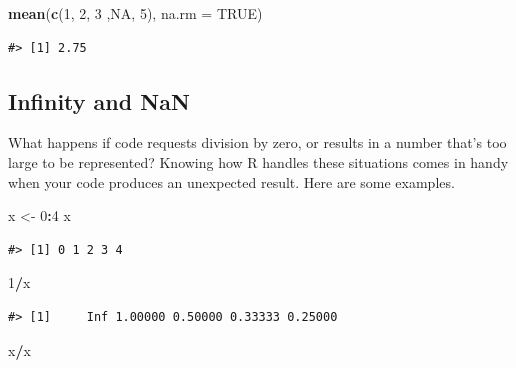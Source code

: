 \documentclass[
  11pt,
]{krantz}
\newenvironment{Shaded}{\begin{snugshade}}{\end{snugshade}}
\newcommand{\DataTypeTok}[1]{\textcolor[rgb]{0.13,0.29,0.53}{#1}}
\newcommand{\DecValTok}[1]{\textcolor[rgb]{0.00,0.00,0.81}{#1}}
\newcommand{\KeywordTok}[1]{\textcolor[rgb]{0.13,0.29,0.53}{\textbf{#1}}}
\newcommand{\NormalTok}[1]{#1}
\newcommand{\OperatorTok}[1]{\textcolor[rgb]{0.81,0.36,0.00}{\textbf{#1}}}
\newcommand{\OtherTok}[1]{\textcolor[rgb]{0.56,0.35,0.01}{#1}}
\newcommand{\StringTok}[1]{\textcolor[rgb]{0.31,0.60,0.02}{#1}}
\theoremstyle{definition}
\theoremstyle{definition}
\theoremstyle{definition}
\theoremstyle{definition}
\theoremstyle{remark}
\begin{document}
\begin{Shaded}
\begin{Highlighting}[]
\KeywordTok{mean}\NormalTok{(}\KeywordTok{c}\NormalTok{(}\DecValTok{1}\NormalTok{, }\DecValTok{2}\NormalTok{, }\DecValTok{3}\NormalTok{ ,}\OtherTok{NA}\NormalTok{, }\DecValTok{5}\NormalTok{), }\DataTypeTok{na.rm =} \OtherTok{TRUE}\NormalTok{)}
\end{Highlighting}
\end{Shaded}

\begin{verbatim}
#> [1] 2.75
\end{verbatim}

\hypertarget{infinity-and-nan}{%
\subsection{Infinity and NaN}\label{infinity-and-nan}}

What happens if code requests division by zero, or results in a number that's too large to be represented? Knowing how R handles these situations comes in handy when your code produces an unexpected result. Here are some examples.

\begin{Shaded}
\begin{Highlighting}[]
\NormalTok{x \textless{}{-}}\StringTok{ }\DecValTok{0}\OperatorTok{:}\DecValTok{4}
\NormalTok{x}
\end{Highlighting}
\end{Shaded}

\begin{verbatim}
#> [1] 0 1 2 3 4
\end{verbatim}

\begin{Shaded}
\begin{Highlighting}[]
\DecValTok{1}\OperatorTok{/}\NormalTok{x}
\end{Highlighting}
\end{Shaded}

\begin{verbatim}
#> [1]     Inf 1.00000 0.50000 0.33333 0.25000
\end{verbatim}

\begin{Shaded}
\begin{Highlighting}[]
\NormalTok{x}\OperatorTok{/}\NormalTok{x}
\end{Highlighting}
\end{Shaded}
\end{document}
